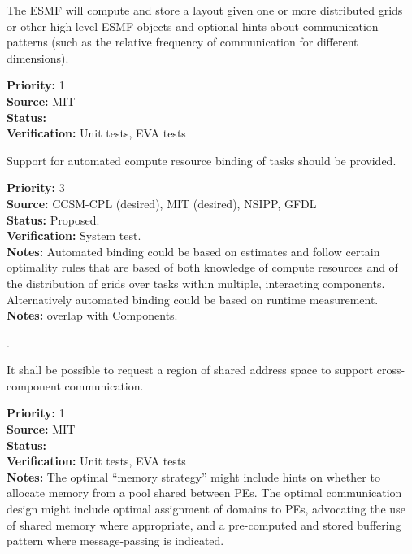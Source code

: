 The ESMF will compute and store a layout given one or more 
distributed grids or other high-level ESMF objects and optional 
hints about communication patterns (such as the relative 
frequency of communication for different dimensions).
\begin{reqlist}
  {\bf Priority:} 1 \\
  {\bf Source:}  MIT \\
  {\bf Status:}  \\
  {\bf Verification:} Unit tests, EVA tests \\
\end{reqlist}

Support for automated compute resource binding of tasks should
  be provided.
\begin{reqlist}
{\bf Priority:} 3 \\
{\bf Source:}  CCSM-CPL (desired), MIT (desired), NSIPP, GFDL \\
{\bf Status:} Proposed. \\
{\bf Verification:} System test.\\ 
{\bf Notes:}  Automated binding could be based on estimates and follow
  certain optimality rules that are based of both knowledge of compute
  resources and of the distribution of grids over tasks within
  multiple, interacting components.  Alternatively automated binding
  could be based on runtime measurement.
{\bf Notes:} overlap with Components.
\end{reqlist}

.

It shall be possible to request a region of shared address space to support
cross-component communication.

\begin{reqlist}
  {\bf Priority:} 1 \\
  {\bf Source:}  MIT \\
  {\bf Status:}  \\
  {\bf Verification:} Unit tests, EVA tests \\
  {\bf Notes:} The optimal ``memory strategy'' might include hints on
  whether to allocate memory from a pool shared between PEs. The
  optimal communication design might include optimal assignment of
  domains to PEs, advocating the use of shared memory where
  appropriate, and a pre-computed and stored buffering pattern where
  message-passing is indicated.  
\end{reqlist}

